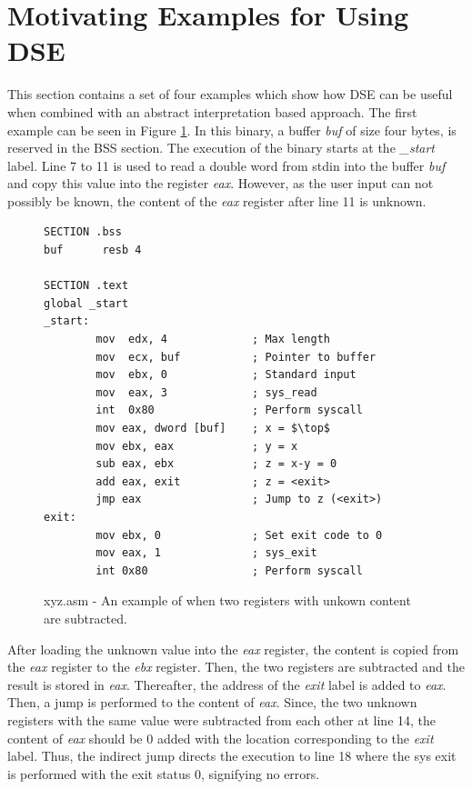 \documentclass{kththesis}
\newcommand{\fbcomment}[1]{{#1}}
\renewcommand{\fbcomment}[1]{}
\renewcommand{\it}[1]{\textit{#1}}
\begin{document}
\section{Motivating Examples for Using DSE}\label{sec:MotExamples}
\fbcomment{\color{red}Goal: Provide 4 examples of when DSE can be useful. (Ex 1: A case that can be handled by DSE but not Jakstab. Ex 2: Why it is important to alternate multiple times between under and over-approximation, Ex 3: Why the second version has higher soundness. Ex 4: That the under-approximation can be useful even when there is a true top in a binary)}
This section contains a set of four examples which show how DSE can be useful when combined with an abstract interpretation based approach. The first example can be seen in Figure \ref{fig:xyz.asm}. In this binary, a buffer \it{buf} of size four bytes, is reserved in the BSS section. The execution of the binary starts at the \it{\_start} label. Line 7 to 11 is used to read a double word from stdin into the buffer \it{buf} and copy this value into the register \it{eax}. However, as the user input can not possibly be known, the content of the \it{eax} register after line 11 is unknown.
\begin{figure}[!th]
    \centering
\begin{tcolorbox}
\begin{verbatim}
SECTION .bss
buf      resb 4

SECTION .text
global _start
_start:
        mov  edx, 4             ; Max length
        mov  ecx, buf           ; Pointer to buffer
        mov  ebx, 0             ; Standard input
        mov  eax, 3             ; sys_read
        int  0x80               ; Perform syscall
        mov eax, dword [buf]    ; x = $\top$
        mov ebx, eax            ; y = x
        sub eax, ebx            ; z = x-y = 0
        add eax, exit           ; z = <exit>
        jmp eax                 ; Jump to z (<exit>)
exit:
        mov ebx, 0              ; Set exit code to 0
        mov eax, 1              ; sys_exit
        int 0x80                ; Perform syscall
\end{verbatim}
\end{tcolorbox}
\caption{xyz.asm - An example of when two registers with unkown content are subtracted.}
    \label{fig:xyz.asm}
\end{figure}
\noindent
After loading the unknown value into the \it{eax} register, the content is copied from the \it{eax} register to the \it{ebx} register. Then, the two registers are subtracted and the result is stored in \it{eax}. Thereafter, the address of the \it{exit} label is added to \it{eax}. Then, a jump is performed to the content of \it{eax}. Since, the two unknown registers with the same value were subtracted from each other at line 14, the content of \it{eax} should be $0$ added with the location corresponding to the \it{exit} label. Thus, the indirect jump directs the execution to line 18 where the sys exit is performed with the exit status $0$, signifying no errors.
\end{document}
